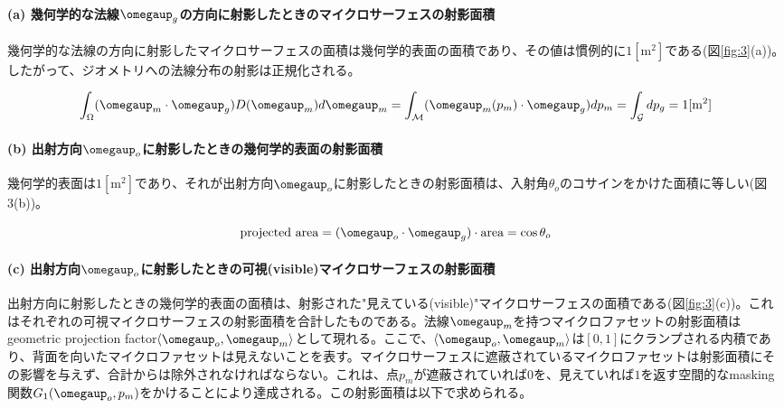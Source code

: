 \documentclass[a4j,xelatex,ja=standard]{bxjsarticle}
\begin{document}
\paragraph{(a) 幾何学的な法線$\boldsymbol{\omegaup}_g$の方向に射影したときのマイクロサーフェスの射影面積}

幾何学的な法線の方向に射影したマイクロサーフェスの面積は幾何学的表面の面積であり、その値は慣例的に$1 [\text{m}^2]$である(図\ref{fig:3}(a))。したがって、ジオメトリへの法線分布の射影は正規化される。

\begin{equation}
    \int_\Omega (\boldsymbol{\omegaup}_m \cdot \boldsymbol{\omegaup}_g) D(\boldsymbol{\omegaup}_m) d\boldsymbol{\omegaup}_m = \int_\mathcal{M} (\boldsymbol{\omegaup}_m(p_m) \cdot \boldsymbol{\omegaup}_g) dp_m = \int_\mathcal{G} dp_g = 1 [\text{m}^2]
    \label{eq:9}
\end{equation}

\paragraph{(b) 出射方向$\boldsymbol{\omegaup}_o$に射影したときの幾何学的表面の射影面積}

幾何学的表面は$1 [\text{m}^2]$であり、それが出射方向$\boldsymbol{\omegaup}_o$に射影したときの射影面積は、入射角$\theta_o$のコサインをかけた面積に等しい(図3(b))。

\begin{equation}
    \text{projected area} = (\boldsymbol{\omegaup}_o \cdot \boldsymbol{\omegaup}_g) \cdot \text{area} = \cos \theta_o
    \label{eq:10}
\end{equation}

\paragraph{(c) 出射方向$\boldsymbol{\omegaup}_o$に射影したときの可視(visible)マイクロサーフェスの射影面積}

出射方向に射影したときの幾何学的表面の面積は、射影された"見えている(visible)"マイクロサーフェスの面積である(図\ref{fig:3}(c))。これはそれぞれの可視マイクロサーフェスの射影面積を合計したものである。法線$\boldsymbol{\omegaup}_m$を持つマイクロファセットの射影面積はgeometric projection factor$\langle \boldsymbol{\omegaup}_o, \boldsymbol{\omegaup}_m \rangle$として現れる。ここで、$\langle \boldsymbol{\omegaup}_o, \boldsymbol{\omegaup}_m \rangle$は$[0, 1]$にクランプされる内積であり、背面を向いたマイクロファセットは見えないことを表す。マイクロサーフェスに遮蔽されているマイクロファセットは射影面積にその影響を与えず、合計からは除外されなければならない。これは、点$p_m$が遮蔽されていれば$0$を、見えていれば$1$を返す空間的なmasking関数$G_1(\boldsymbol{\omegaup}_o, p_m)$をかけることにより達成される。この射影面積は以下で求められる。
\end{document}
